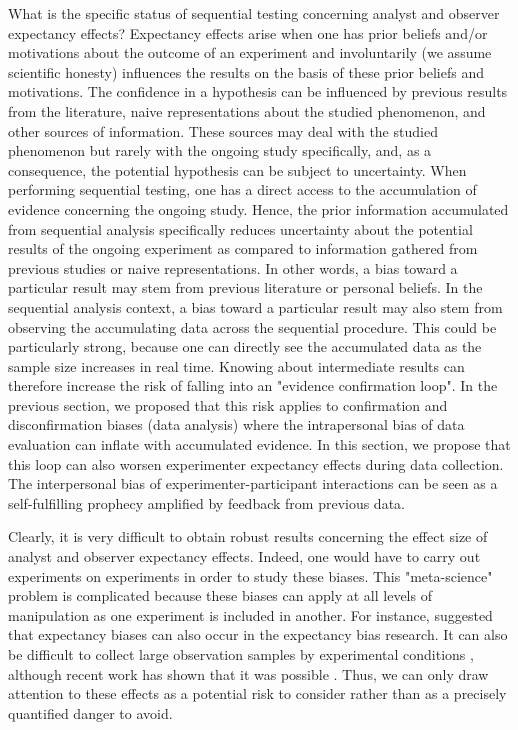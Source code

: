 \documentclass[a4paper,jou,natbib,floatsintext,donotrepeattitle]{apa6}
\begin{document}
What is the specific status of sequential testing concerning analyst and observer expectancy effects? Expectancy effects arise when one has prior beliefs and/or motivations about the outcome of an experiment and involuntarily (we assume scientific honesty) influences the results on the basis of these prior beliefs and motivations. The confidence in a hypothesis can be influenced by previous results from the literature, naive representations about the studied phenomenon, and other sources of information. These sources may deal with the studied phenomenon but rarely with the ongoing study specifically, and, as a consequence, the potential hypothesis can be subject to uncertainty. When performing sequential testing, one has a direct access to the accumulation of evidence concerning the ongoing study. Hence, the prior information accumulated from sequential analysis specifically reduces uncertainty about the potential results of the ongoing experiment as compared to information gathered from previous studies or naive representations. In other words, a bias toward a particular result may stem from previous literature or personal beliefs. In the sequential analysis context, a bias toward a particular result may also stem from observing the accumulating data across the sequential procedure. This could be particularly strong, because one can directly see the accumulated data as the sample size increases in real time. Knowing about intermediate results can therefore increase the risk of falling into an "evidence confirmation loop". In the previous section, we proposed that this risk applies to confirmation and disconfirmation biases (data analysis) where the intrapersonal bias of data evaluation can inflate with accumulated evidence. In this section, we propose that this loop can also worsen experimenter expectancy effects during data collection. The interpersonal bias of experimenter-participant interactions can be seen as a self-fulfilling prophecy amplified by feedback from previous data. 

Clearly, it is very difficult to obtain robust results concerning the effect size of analyst and observer expectancy effects. Indeed, one would have to carry out experiments on experiments in order to study these biases. This "meta-science" problem is complicated because these biases can apply at all  levels of manipulation as one experiment is included in another. For instance, \cite{barber_expecting_1978} suggested that expectancy biases can also occur in the expectancy bias research. It can also be difficult to collect large observation samples by experimental conditions \citep[e.g.,][]{zoble_interaction_1969}, although recent work has shown that it was possible \citep {gilder_role_2018}. Thus, we can only draw attention to these effects as a potential risk to consider rather than as a precisely quantified danger to avoid.
\end{document}
